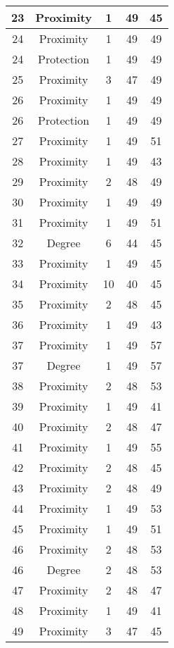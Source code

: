 \documentclass[results.tex]{subfiles}
\begin{document}
\begin{center}
\begin{tabular}{| c || c | c | c | c |}
    \hline
    23 & Proximity & 1 & 49 & 45 \\ 
    \hline
    24 & Proximity & 1 & 49 & 49 \\ 
    \hline
    24 & Protection & 1 & 49 & 49 \\ 
    \hline
    25 & Proximity & 3 & 47 & 49 \\ 
    \hline
    26 & Proximity & 1 & 49 & 49 \\ 
    \hline
    26 & Protection & 1 & 49 & 49 \\ 
    \hline
    27 & Proximity & 1 & 49 & 51 \\ 
    \hline
    28 & Proximity & 1 & 49 & 43 \\ 
    \hline
    29 & Proximity & 2 & 48 & 49 \\ 
    \hline
    30 & Proximity & 1 & 49 & 49 \\ 
    \hline
    31 & Proximity & 1 & 49 & 51 \\ 
    \hline
    32 & Degree & 6 & 44 & 45 \\ 
    \hline
    33 & Proximity & 1 & 49 & 45 \\ 
    \hline
    34 & Proximity & 10 & 40 & 45 \\ 
    \hline
    35 & Proximity & 2 & 48 & 45 \\ 
    \hline
    36 & Proximity & 1 & 49 & 43 \\ 
    \hline
    37 & Proximity & 1 & 49 & 57 \\ 
    \hline
    37 & Degree & 1 & 49 & 57 \\ 
    \hline
    38 & Proximity & 2 & 48 & 53 \\ 
    \hline
    39 & Proximity & 1 & 49 & 41 \\ 
    \hline
    40 & Proximity & 2 & 48 & 47 \\ 
    \hline
    41 & Proximity & 1 & 49 & 55 \\ 
    \hline
    42 & Proximity & 2 & 48 & 45 \\ 
    \hline
    43 & Proximity & 2 & 48 & 49 \\ 
    \hline
    44 & Proximity & 1 & 49 & 53 \\ 
    \hline
    45 & Proximity & 1 & 49 & 51 \\ 
    \hline
    46 & Proximity & 2 & 48 & 53 \\ 
    \hline
    46 & Degree & 2 & 48 & 53 \\ 
    \hline
    47 & Proximity & 2 & 48 & 47 \\ 
    \hline
    48 & Proximity & 1 & 49 & 41 \\ 
    \hline
    49 & Proximity & 3 & 47 & 45 \\ 
    \hline   \end{tabular}
\end{center}
\end{document}

